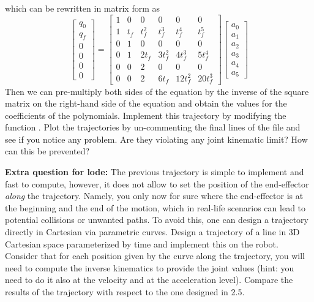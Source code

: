 \documentclass[11pt]{article}
\begin{document}
which can be rewritten in matrix form as
\begin{equation*}
	\begin{bmatrix}
		q_0 \\
		q_f \\
		0 \\
		0 \\
		0 \\
		0
	\end{bmatrix} =
	\begin{bmatrix}
		1 & 0   & 0     &       0 &        0 &     0 \\
		1 & t_f & t_f^2 &   t_f^3 &    t_f^4 & t_f^5 \\
		0 &   1 &     0 &       0 &        0 &     0 \\
		0 &   1 & 2 t_f & 3 t_f^2 &  4 t_f^3 & 5 t_f^4 \\
		0 &   0 &     2 &       0 &        0 &     0 \\
		0 &   0 &     2 &   6 t_f & 12 t_f^2 & 20 t_f^3
	\end{bmatrix}
	\begin{bmatrix}
		a_0 \\
		a_1 \\ 
		a_2 \\
		a_3 \\
		a_4 \\
		a_5
	\end{bmatrix}
\end{equation*}
Then we can pre-multiply both sides of the equation by the inverse of the square matrix on the right-hand side of the equation and obtain the values for the coefficients of the polynomials.
Implement this trajectory by modifying the function . Plot the trajectories by un-commenting the final lines of the file  and see if you notice any problem. Are they violating any joint kinematic limit? How can this be prevented? 

\textbf{Extra question for lode:} The previous trajectory is simple to implement and fast to compute, however, it does not allow to set the position of the end-effector \textit{along} the trajectory. Namely, you only now for sure where the end-effector is at the beginning and the end of the motion, which in real-life scenarios can lead to potential collisions or unwanted paths. To avoid this, one can design a trajectory directly in Cartesian via parametric curves. Design a trajectory of a line in 3D Cartesian space parameterized by time and implement this on the robot. Consider that for each position given by the curve along the trajectory, you will need to compute the inverse kinematics to provide the joint values (hint: you need to do it also at the velocity and at the acceleration level). Compare the results of the trajectory with respect to the one designed in 2.5.\\
\end{document}
